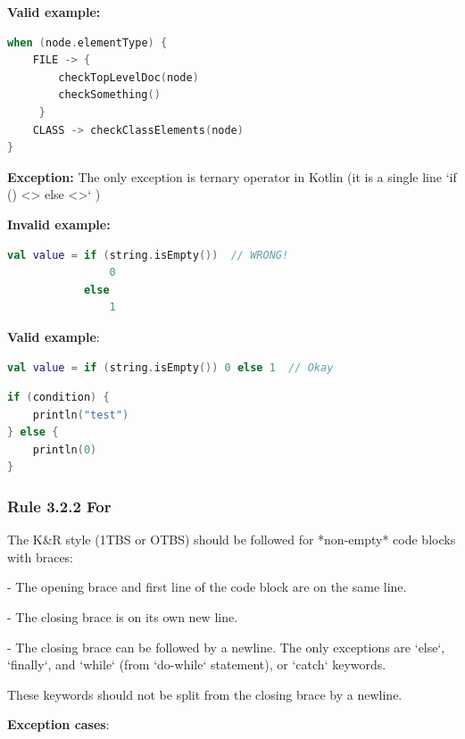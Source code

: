 \textbf{Valid example:}



\begin{lstlisting}[language=Kotlin]
when (node.elementType) {
    FILE -> {
        checkTopLevelDoc(node)
        checkSomething()
     }
    CLASS -> checkClassElements(node)
}
\end{lstlisting}
\textbf{Exception:} The only exception is ternary operator in Kotlin (it is a single line `if () <> else <>` ) 



\textbf{Invalid example:}



\begin{lstlisting}[language=Kotlin]
val value = if (string.isEmpty())  // WRONG!
                0
            else
                1
\end{lstlisting}


\textbf{Valid example}: 



\begin{lstlisting}[language=Kotlin]
val value = if (string.isEmpty()) 0 else 1  // Okay
\end{lstlisting}


\begin{lstlisting}[language=Kotlin]
if (condition) {
    println("test")
} else {
    println(0)
}
\end{lstlisting}


\subsubsection*{\textbf{Rule 3.2.2 For}}
\leavevmode\newline



The K\&R style (1TBS or OTBS) should be followed for *non-empty* code blocks with braces:

- The opening brace and first line of the code block are on the same line.

- The closing brace is on its own new line.

- The closing brace can be followed by a newline. The only exceptions are `else`, `finally`, and `while` (from `do-while` statement), or `catch` keywords.

These keywords should not be split from the closing brace by a newline.



\textbf{Exception cases}: 



